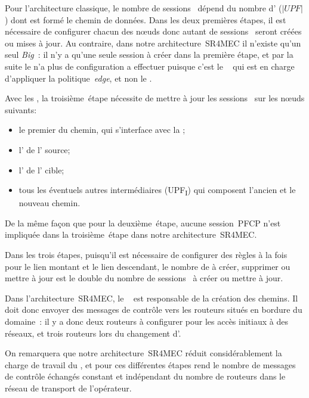 \documentclass[../main.tex]{subfiles}
\begin{document}
Pour l’architecture classique, le nombre de sessions~ dépend du nombre d’ ($|\mathit{UPF}|$) dont est formé le chemin de données.
Dans les deux premières étapes, il est nécessaire de configurer chacun des nœuds donc autant de sessions~ seront créées ou mises à jour.
Au contraire, dans notre architecture~SR4MEC il n’existe qu’un seul \textit{Big~}: il n’y a qu’une seule session à créer dans la première étape, et par la suite le  n’a plus de configuration a effectuer puisque c’est le ~ qui est en charge d’appliquer la politique~\textit{edge}, et non le .

Avec les , la troisième~étape nécessite de mettre à jour les sessions~ sur les nœuds suivants:
\begin{itemize}
    \item le premier  du chemin, qui s’interface avec la ;
    \item l’ de l’ source;
    \item l’ de l’ cible;
    \item tous les éventuels autres  intermédiaires (UPF\textsubscript{I}) qui composent l’ancien et le nouveau chemin.
\end{itemize}
De la même façon que pour la deuxième~étape, aucune session~PFCP n’est impliquée dans la troisième~étape dans notre architecture~SR4MEC.

Dans les trois étapes, puisqu’il est nécessaire de configurer des règles à la fois pour le lien montant et le lien descendant, le nombre de  à créer, supprimer ou mettre à jour est le double du nombre de sessions~ à créer ou mettre à jour.

Dans l’architecture~SR4MEC, le ~ est responsable de la création des chemins.
Il doit donc envoyer des messages de contrôle vers les routeurs situés en bordure du domaine~: il y a donc deux routeurs à configurer pour les accès initiaux à des réseaux, et trois routeurs lors du changement d’.

On remarquera que notre architecture~SR4MEC réduit considérablement la charge de travail du , et pour ces différentes étapes rend le nombre de messages de contrôle échangés constant et indépendant du nombre de routeurs dans le réseau de transport de l’opérateur.
\end{document}
